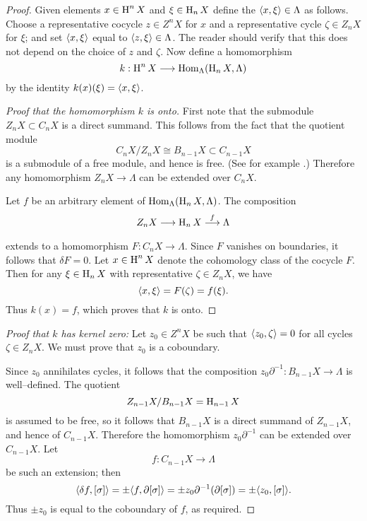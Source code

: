 \documentclass[../main]{subfiles}
\begin{document}
\begin{proof}
Given elements $x \in \operatorname{H}^n X$ and $\xi \in \operatorname{H}_n X$ define the  $\langle x,\xi\rangle \in \Lambda$ as follows. Choose a representative cocycle $z \in Z^n X$ for $x$ and a representative cycle $\zeta \in Z_n X$ for $\xi$; and set $\langle x,\xi\rangle$ equal to $\langle z,\xi\rangle \in \Lambda$. The reader should verify that this does not depend on the choice of $z$ and $\zeta$. Now define a homomorphism \[k : \operatorname{H}^n X \longrightarrow \operatorname{Hom}_\Lambda(\operatorname{H}_n X, \Lambda)\] by the identity $k(x)(\xi) = \langle x,\xi\rangle$.

\begin{proof}[Proof that the homomorphism $k$ is onto]
First note that the submodule \newline $Z_n X \subset C_n X$ is a direct summand. This follows from the fact that the quotient module \[C_n X/Z_n X \cong B_{n - 1} X \subset C_{n - 1} X\] is a submodule of a free module, and hence is free. (See for example \cite{kaplansky2018infinite}.) Therefore any homomorphism $Z_n X \longrightarrow \Lambda$ can be extended over $C_n X$. 

Let $f$ be an arbitrary element of $\operatorname{Hom}_\Lambda(\operatorname{H}_n X, \Lambda)$. The composition \[Z_n X \varrightarrow{} \homology_n X \varrightarrow{f} \Lambda\] extends to a homomorphism $F : C_n X \longrightarrow \Lambda$. Since $F$ vanishes on boundaries, it follows that $\delta F = 0$. Let $x \in \operatorname{H}^n X$ denote the cohomology class of the cocycle $F$. Then for any $\xi \in \operatorname{H}_n X$ with representative $\zeta \in Z_n X$, we have \[\langle x,\xi\rangle = F(\zeta) = f(\xi).\] Thus $k(x) = f$, which proves that $k$ is onto. 
\end{proof}

\emph{Proof that $k$ has kernel zero:}
Let $z_0 \in Z^n X$ be such that $\langle z_0,\zeta\rangle = 0$ for all cycles $\zeta \in Z_n X$. We must prove that $z_0$ is a coboundary. 

Since $z_0$ annihilates cycles, it follows that the composition \newline $z_0 \partial^{-1} : B_{n - 1} X \longrightarrow \Lambda$ is well--defined. The quotient \[Z_{n - 1} X/B_{n - 1} X = \operatorname{H}_{n - 1} X\] is assumed to be free, so it follows that $B_{n - 1} X$ is a direct summand of $Z_{n - 1} X$, and hence of $C_{n - 1} X$. Therefore the homomorphism $z_0 \partial^{-1}$ can be extended over $C_{n - 1} X$. Let \[f : C_{n - 1} X \longrightarrow \Lambda\] be such an extension; then \[\langle\delta f,[\sigma]\rangle = \pm \langle f,\partial[\sigma]\rangle = \pm z_0 \partial^{-1} (\partial[\sigma]) = \pm \langle z_0,[\sigma]\rangle.\] Thus $\pm z_0$ is equal to the coboundary of $f$, as required.
\end{proof}
\end{document}
